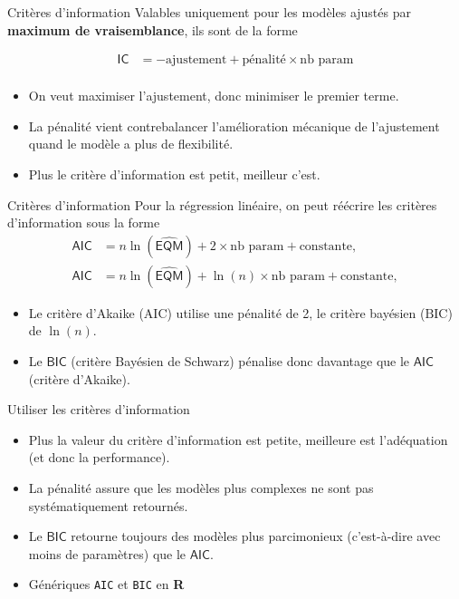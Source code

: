 \documentclass[
  ignorenonframetext,
]{beamer}
\providecommand{\tightlist}{%
  \setlength{\itemsep}{0pt}\setlength{\parskip}{0pt}}\usepackage{longtable,booktabs,array}
\begin{document}
\begin{frame}{Critères d'information}
\label{crituxe8res-dinformation}
Valables uniquement pour les modèles ajustés par \textbf{maximum de
vraisemblance}, ils sont de la forme

\begin{align*}
\mathsf{IC} &= -\text{ajustement} + \text{pénalité} \times\text{nb param} \\
\end{align*}

\begin{itemize}
\tightlist
\item
  On veut maximiser l'ajustement, donc minimiser le premier terme.
\item
  La pénalité vient contrebalancer l'amélioration mécanique de
  l'ajustement quand le modèle a plus de flexibilité.
\item
  Plus le critère d'information est petit, meilleur c'est.
\end{itemize}
\end{frame}

\begin{frame}{Critères d'information}
\label{crituxe8res-dinformation-1}
Pour la régression linéaire, on peut réécrire les critères d'information
sous la forme \begin{align*}
\mathsf{AIC} &=n \ln (\widehat{\mathsf{EQM}}) +2\times \text{nb param}+ \text{constante},\\
\mathsf{AIC} &=n \ln (\widehat{\mathsf{EQM}}) +\ln(n)\times \text{nb param}+ \text{constante},
\end{align*}

\begin{itemize}
\item
  Le critère d'Akaike (\(\text{AIC}\)) utilise une pénalité de 2, le
  critère bayésien (\(\text{BIC}\)) de \(\ln(n)\).
\item
  Le \(\mathsf{BIC}\) (critère Bayésien de Schwarz) pénalise donc
  davantage que le \(\mathsf{AIC}\) (critère d'Akaike).
\end{itemize}
\end{frame}

\begin{frame}[fragile]{Utiliser les critères d'information}
\label{utiliser-les-crituxe8res-dinformation}
\begin{itemize}
\tightlist
\item
  Plus la valeur du critère d'information est petite, meilleure est
  l'adéquation (et donc la performance).
\item
  La pénalité assure que les modèles plus complexes ne sont pas
  systématiquement retournés.
\item
  Le \(\textsf{BIC}\) retourne toujours des modèles plus parcimonieux
  (c'est-à-dire avec moins de paramètres) que le \(\textsf{AIC}\).
\item
  Génériques \texttt{AIC} et \texttt{BIC} en \textbf{R}
\end{itemize}
\end{frame}
\end{document}
